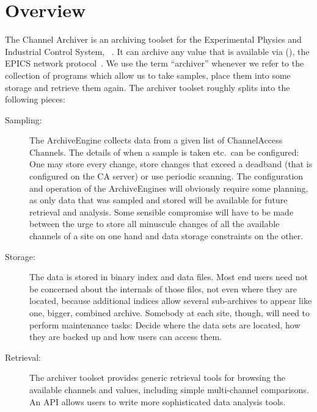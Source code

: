 \chapter{Overview}
The Channel Archiver is an archiving toolset for the Experimental Physics
and Industrial Control System,  ~\cite{ANLweb}.
It can archive any value that is available via 
(), the EPICS network protocol~\cite{hill89}.
We use the term ``archiver''
whenever we refer to the collection of programs which allow us to take samples,
place them into some storage and retrieve them again. The archiver
toolset roughly splits into the following pieces:

\begin{description}
\item[\sffamily Sampling:]
The ArchiveEngine collects data from a given list of ChannelAccess
Channels.  The details of when a sample is taken etc.\ can be
configured: One may store every change, store changes that exceed a
deadband (that is configured on the CA server) or use periodic
scanning.
The configuration and operation of the ArchiveEngines will obviously
require some planning, as only data that was sampled and stored will
be available for future retrieval and analysis. Some sensible
compromise will have to be made between the urge to store all
minuscule changes of all the available channels of a site on one hand
and data storage constraints on the other.

\item[\sffamily Storage:]
The data is stored in binary index and data files. Most end users need not
be concerned about the internals of those files, not even where they
are located, because additional indices allow several sub-archives to
appear like one, bigger, combined archive.
Somebody at each site, though, will need to perform maintenance
tasks: Decide where the data sets are located, how they are
backed up and how users can access them. 

\item[\sffamily Retrieval:]
The archiver toolset provides generic retrieval tools for browsing the
available channels and values, including simple multi-channel
comparisons.
An API allows users to write more sophisticated data analysis tools.
\end{description}

